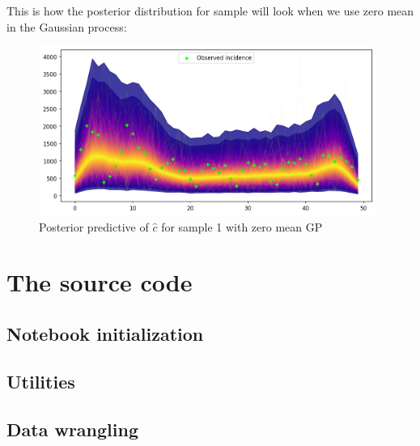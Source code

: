 \documentclass[
  digital, %
  oneside, %
  lof,     %
  lot,     %
]{fithesis4}
\begin{document}
This is how the posterior distribution for sample will look when we use zero mean in the Gaussian process:

\begin{figure}[H]
  \centering
  \includegraphics[width=11cm]{static/images/inc-model-ppc-plot-1-zero-mean.png}
  \caption{Posterior predictive of $\hat{c}$ for sample 1 with zero mean GP}
  \label{fig:incidence-posterior-1-zero-mean}
\end{figure}


\newpage
\section{The source code}

\subsection{Notebook initialization}




\subsection{Utilities}









% 


\subsection{Data wrangling}
\end{document}
